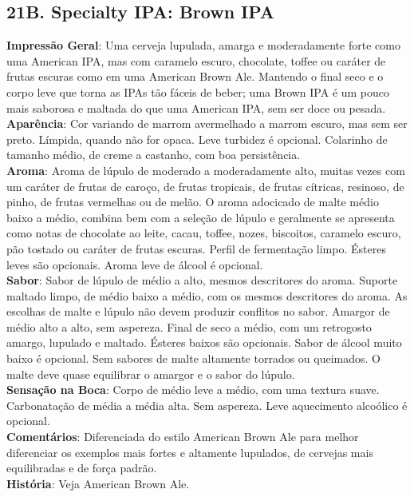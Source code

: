 \subsection*{21B. Specialty IPA: Brown IPA}
\textbf{Impressão Geral}: Uma cerveja lupulada, amarga e moderadamente forte como uma American IPA, mas com caramelo escuro, chocolate, toffee ou caráter de frutas escuras como em uma American Brown Ale. Mantendo o final seco e o corpo leve que torna as IPAs tão fáceis de beber; uma Brown IPA é um pouco mais saborosa e maltada do que uma American IPA, sem ser doce ou pesada. \\
\textbf{Aparência}: Cor variando de marrom avermelhado a marrom escuro, mas sem ser preto. Límpida, quando não for opaca. Leve turbidez é opcional. Colarinho de tamanho médio, de creme a castanho, com boa persistência. \\
\textbf{Aroma}: Aroma de lúpulo de moderado a moderadamente alto, muitas vezes com um caráter de frutas de caroço, de frutas tropicais, de frutas cítricas, resinoso, de pinho, de frutas vermelhas ou de melão. O aroma adocicado de malte médio baixo a médio, combina bem com a seleção de lúpulo e geralmente se apresenta como notas de chocolate ao leite, cacau, toffee, nozes, biscoitos, caramelo escuro, pão tostado ou caráter de frutas escuras. Perfil de fermentação limpo. Ésteres leves são opcionais. Aroma leve de álcool é opcional. \\
\textbf{Sabor}: Sabor de lúpulo de médio a alto, mesmos descritores do aroma. Suporte maltado limpo, de médio baixo a médio, com os mesmos descritores do aroma. As escolhas de malte e lúpulo não devem produzir conflitos no sabor. Amargor de médio alto a alto, sem aspereza. Final de seco a médio, com um retrogosto amargo, lupulado e maltado. Ésteres baixos são opcionais. Sabor de álcool muito baixo é opcional. Sem sabores de malte altamente torrados ou queimados. O malte deve quase equilibrar o amargor e o sabor do lúpulo. \\
\textbf{Sensação na Boca}: Corpo de médio leve a médio, com uma textura suave. Carbonatação de média a média alta. Sem aspereza. Leve aquecimento alcoólico é opcional. \\
\textbf{Comentários}: Diferenciada do estilo American Brown Ale para melhor diferenciar os exemplos mais fortes e altamente lupulados, de cervejas mais equilibradas e de força padrão. \\
\textbf{História}: Veja American Brown Ale. \\

